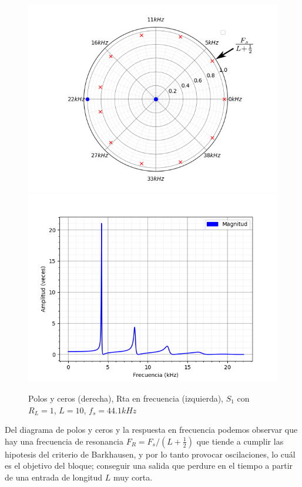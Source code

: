 \documentclass[assd_tp2_main.tex]{subfiles}
\begin{document}
\begin{figure}[H]	
	\includegraphics[scale=0.45]{graficos/polos.png}
	\includegraphics[scale=0.58]{graficos/freq_response.png}
	\caption{Polos y ceros (derecha), Rta en frecuencia (izquierda), $S_1$ con $R_L=1$, $L=10$, $f_s=44.1kHz$}
	\label{fig:polosCeros}
\end{figure}

Del diagrama de polos y ceros y la respuesta en frecuencia podemos observar que hay una frecuencia de resonancia $F_R=F_s/(L+\frac{1}{2})$ que tiende a cumplir las hipotesis del criterio de Barkhausen, y por lo tanto provocar oscilaciones, lo cuál es el objetivo del bloque; conseguir una salida que perdure en el tiempo a partir de una entrada de longitud $L$ muy corta.
\end{document}
